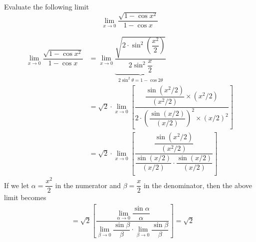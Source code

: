 



\question[5] Evaluate the following limit \[ \lim_{x\to 0}\dfrac{\sqrt{1-\cos x^2}}{1-\cos x}\]

\ifprintanswers
\fi

\begin{solution}[\halfpage]
  \begin{align}
    \lim_{x\to 0}\dfrac{\sqrt{1-\cos x^2}}{1-\cos x} &=
    \lim_{x\to 0}\underbrace{\dfrac{\sqrt{2\cdot\sin^2\left(\dfrac{x^2}{2}\right)}}{2\sin^2\dfrac{x}{2}}}_{2\sin^2\theta = 1-\cos 2\theta} \\
    &= \sqrt{2}\cdot\lim_{x\to 0}\left[\dfrac
    {\dfrac{\sin (x^2/2)}{(x^2/2)}\times (x^2/2)}
    {2\cdot\left(\dfrac{\sin (x/2)}{(x/2)}\right)^2
    \times\left( x/2 \right)^2}\right] \\
    &= \sqrt{2}\cdot\lim_{x\to 0}\left[\dfrac
    {\dfrac{\sin (x^2/2)}{(x^2/2)}}
    {\dfrac{\sin (x/2)}{(x/2)}\cdot\dfrac{\sin (x/2)}{(x/2)}}\right]
  \end{align}
  If we let $\alpha = \dfrac{x^2}{2}$ in the numerator and $\beta = \dfrac{x}{2}$
  in the denominator, then the above limit becomes 
  \begin{align}
    &= \sqrt{2}\left[\dfrac{\lim_{\alpha\to 0}\dfrac{\sin\alpha}{\alpha}}
    {\lim_{\beta\to 0}\dfrac{\sin\beta}{\beta}\cdot\lim_{\beta\to 0}\dfrac{\sin\beta}{\beta}}\right] = \sqrt{2}
  \end{align}
\end{solution}

